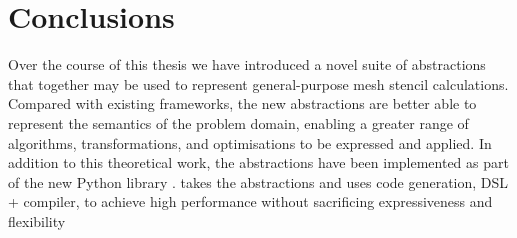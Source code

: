 \documentclass[thesis]{subfiles}
\begin{document}
\chapter{Conclusions}
\label{chapter:conclusions}

Over the course of this thesis we have introduced a novel suite of abstractions that together may be used to represent general-purpose mesh stencil calculations.
Compared with existing frameworks, the new abstractions are better able to represent the semantics of the problem domain, enabling a greater range of algorithms, transformations, and optimisations to be expressed and applied.
In addition to this theoretical work, the abstractions have been implemented as part of the new Python library .
 takes the abstractions and uses code generation, DSL + compiler, to achieve high performance without sacrificing expressiveness and flexibility  %
\end{document}
